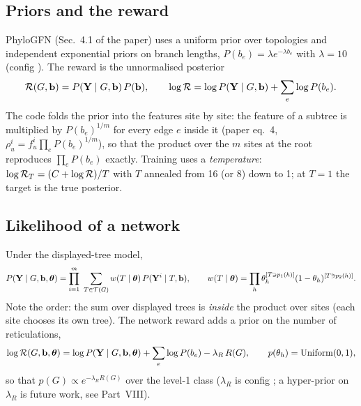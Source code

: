\subsection{Priors and the reward}
PhyloGFN (Sec.~4.1 of the paper) uses a uniform prior over topologies and independent exponential priors on branch lengths, $P(b_e)=\lambda e^{-\lambda b_e}$ with $\lambda=10$ (config ). The reward is the unnormalised posterior
\begin{equation}
\mathcal{R}(G,\mathbf{b})=P(\mathbf{Y}\mid G,\mathbf{b})\,P(\mathbf{b}),\qquad \log\mathcal{R} = \log P(\mathbf{Y}\mid G,\mathbf{b})+\sum_e\log P(b_e).
\end{equation}
The code folds the prior into the features site by site: the feature of a subtree is multiplied by $P(b_e)^{1/m}$ for every edge $e$ inside it (paper eq.~4, $\rho^i_u=f^i_u\prod_e P(b_e)^{1/m}$), so that the product over the $m$ sites at the root reproduces $\prod_e P(b_e)$ exactly. Training uses a \emph{temperature}: $\log\mathcal{R}_T=(C+\log\mathcal{R})/T$ with $T$ annealed from 16 (or 8) down to 1; at $T=1$ the target is the true posterior.

\subsection{Likelihood of a network}
Under the displayed-tree model,
\begin{equation}\label{eq:netlik}
P(\mathbf{Y}\mid G,\mathbf{b},\bm{\theta})=\prod_{i=1}^{m}\ \sum_{T\in\mathcal T(G)} w(T\mid\bm{\theta})\,P(\mathbf{Y}^i\mid T,\mathbf{b}),
\qquad w(T\mid\bm{\theta})=\prod_h\theta_h^{[T\ni p_1(h)]}(1-\theta_h)^{[T\ni p_2(h)]}.
\end{equation}
Note the order: the sum over displayed trees is \emph{inside} the product over sites (each site chooses its own tree). The network reward adds a prior on the number of reticulations,
\begin{equation}
\log\mathcal{R}(G,\mathbf{b},\bm{\theta})=\log P(\mathbf{Y}\mid G,\mathbf{b},\bm{\theta})+\sum_e\log P(b_e)-\lambda_R\,R(G),\qquad p(\theta_h)=\mathrm{Uniform}(0,1),
\end{equation}
so that $p(G)\propto e^{-\lambda_R R(G)}$ over the level-1 class ($\lambda_R$ is config ; a hyper-prior on $\lambda_R$ is future work, see Part~VIII).

